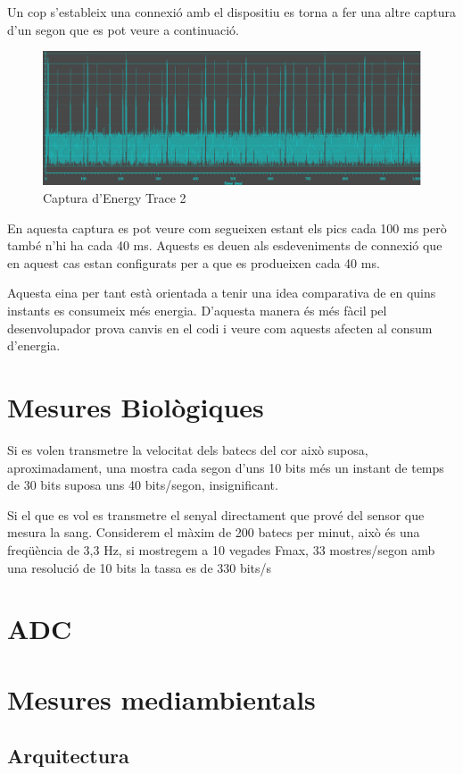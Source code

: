 Un cop s'estableix una connexió amb el dispositiu es torna a fer una altre captura d'un segon que es pot veure a continuació.

\begin{figure}[!h]
	\begin{center}
		\includegraphics[width=\textwidth]{./images/energy_trace_2.png}
		\caption{Captura d'Energy Trace 2}
	\end{center}
\end{figure}

En aquesta captura es pot veure com segueixen estant els pics cada 100 ms però també n'hi ha cada 40 ms.
Aquests es deuen als esdeveniments de connexió que en aquest cas estan configurats per a que es produeixen cada 40 ms.

Aquesta eina per tant està orientada a tenir una idea comparativa de en quins instants es consumeix més energia.
D'aquesta manera és més fàcil pel desenvolupador prova canvis en el codi i veure com aquests afecten al consum d'energia.

\section{Mesures Biològiques}

Si es volen transmetre la velocitat dels batecs del cor això suposa, aproximadament, una mostra cada segon d'uns 10 bits més un instant de temps de 30 bits suposa uns 40 bits/segon, insignificant.

Si el que es vol es transmetre el senyal directament que prové del sensor que mesura la sang.
Considerem el màxim de 200 batecs per minut, això és una freqüència de 3,3 Hz, si mostregem a 10 vegades Fmax, 33 mostres/segon amb una resolució de 10 bits la tassa es de 330 bits/s

\section{ADC}


\section{Mesures mediambientals}
\subsection{Arquitectura}
